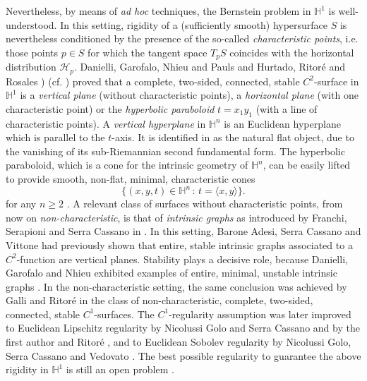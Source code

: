 \documentclass[11pt]{amsart}
\renewcommand{\geq}{\geqslant}
\renewcommand{\ge}{>}
\newcommand{\hhh}{{\mathcal{H}}}
\newcommand{\hn}{\mathbb{H}^n}
\newcommand{\hh}{{\mathbb{H}}}
\theoremstyle{definition}
\theoremstyle{remark}
\numberwithin{equation}{section}
\begin{document}
\medskip
Nevertheless, by means of \emph{ad hoc} techniques, the Bernstein problem in $\hh^1$ is well-understood. In this setting, rigidity of a (sufficiently smooth) hypersurface $S$ is nevertheless conditioned by the presence of the so-called \emph{characteristic points}, i.e. those points $p\in S$ for which the tangent space $T_pS$ coincides with the horizontal distribution $\hhh_p$. 
Danielli, Garofalo, Nhieu and Pauls \cite{MR2648078} and Hurtado, Ritoré and Rosales \cite{MR2609016}) (cf. \cite{MR2165405,MR2983199,MR2435652,MR2472175}) proved that a complete, two-sided, connected, stable $C^2$-surface in $\hh^1$ is a \emph{vertical plane} (without characteristic points), a \emph{horizontal plane} (with one characteristic point) or the \emph{hyperbolic paraboloid} $t=x_1y_1$ (with a line of characteristic points). A \emph{vertical hyperplane} in $\hh^n$ is an Euclidean hyperplane which is parallel to the $t$-axis. It is identified in \cite{MR4923606} as the natural flat object, due to the vanishing of its sub-Riemannian second fundamental form.
The hyperbolic paraboloid, which is a cone for the intrinsic geometry of $\hn$, can be easily lifted to provide smooth, non-flat, minimal, characteristic cones 
\begin{equation}\label{eofjnt4rvjntrgvr22222}
    \{(x,y,t)\in\hh^n\,:\,t=\langle x, y\rangle\}.
\end{equation}
for any $n\geq 2$ \cite{MR4923606}. A relevant class of surfaces without characteristic points, from now on \emph{non-characteristic}, is that of \emph{intrinsic graphs} as introduced by Franchi, Serapioni and Serra Cassano in \cite{MR1871966}.
In this setting, Barone Adesi, Serra Cassano and Vittone \cite{MR2333095} had previously shown that entire, stable intrinsic graphs associated to a $C^2$-function are vertical planes. Stability plays a decisive role, because Danielli, Garofalo and Nhieu exhibited examples of entire, minimal, unstable intrinsic graphs \cite{MR2405158}. In the non-characteristic setting, the same conclusion was achieved by Galli and Ritoré \cite{MR3406514} in the class of non-characteristic, complete, two-sided, connected, stable $C^1$-surfaces. The $C^1$-regularity assumption was later improved to Euclidean Lipschitz regularity by Nicolussi Golo and Serra Cassano \cite{MR3984100} and by the first author and Ritoré \cite{GR24}, and to Euclidean Sobolev regularity by Nicolussi Golo, Serra Cassano and Vedovato \cite{golo2025bernsteinproblemsobolevintrinsic}. The best possible regularity to guarantee the above rigidity in $\hh^1$ is still an open problem \cite{MR4433085}.
\end{document}
